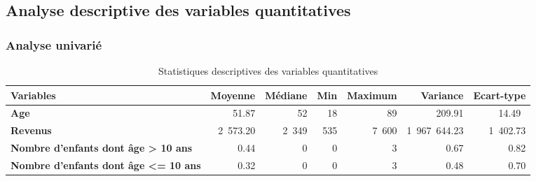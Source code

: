 \documentclass[11pt,a4paper, x11names]{article}\usepackage[]{graphicx}\usepackage[]{color}
\begin{document}
\subsection{Analyse descriptive des variables quantitatives }
\subsubsection{Analyse univarié}

\begin{table}[!h] \centering
\begin{small}
\begin{tabular}{@{}lrrrrrr@{}}\toprule
\textbf{Variables}& \textbf{Moyenne} & \textbf{Médiane}& \textbf{Min} & \textbf{Maximum} & \textbf{Variance} & \textbf{Ecart-type} \\ \midrule
\textbf{Age}          & 51.87 &  52 & 18 & 89 & 209.91 & 14.49\ \\ \hdashline
\textbf{Revenus}      & 2~573.20 & 2~349 & 535&7~600 & 1~967~644.23&1~402.73   \\ \hdashline
\textbf{Nombre d'enfants dont âge > 10 ans} &  0.44 & 0 & 0 & 3 & 0.67 & 0.82  \\  \hdashline
\textbf{Nombre d'enfants dont âge <= 10 ans} &  0.32 & 0 & 0 & 3 & 0.48 & 0.70 \\  
\bottomrule
\end{tabular}
\end{small}
\caption{Statistiques descriptives des variables quantitatives}
\end{table}


\end{document}
